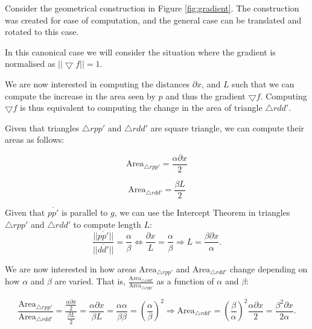 Consider the geometrical construction in Figure \ref{fig:gradient}. The construction was created for ease of computation, and the general case can be translated and rotated to this case.

In this canonical case we will consider the situation where the gradient is normalised as $||\bigtriangledown f|| = 1$. 

We are now interested in computing the distances $\partial x$, and $L$ such that we can compute the increase in the area seen by $p$ and thus the gradient $\bigtriangledown f$. Computing $\bigtriangledown f$ is thus equivalent to computing the change in the area of triangle $\triangle rdd'$.

Given that triangles $\triangle rpp'$ and $\triangle rdd'$ are square triangle, we can compute their areas as follows:

$$\text{Area}_{\triangle rpp'} = \frac{\alpha \partial x}{2}$$

$$\text{Area}_{\triangle rdd'} = \frac{\beta L}{2}$$

Given that $\overline{pp'}$ is parallel to $g$, we can use the Intercept Theorem in triangles $\triangle rpp'$ and $\triangle rdd'$ to compute length $L$: $$\frac{||\overline{pp'}||}{||\overline{dd'}||} = \frac \alpha \beta \iff \frac{\partial x}{L} = \frac \alpha \beta \Rightarrow L = \frac{\beta \partial x}{\alpha}.$$


We are now interested in how areas $\text{Area}_{\triangle rpp'}$ and $\text{Area}_{\triangle rdd'}$ change depending on how $\alpha$ and $\beta$ are varied. That is, $\frac{\text{Area}_{\triangle rdd'}}{\text{Area}_{\triangle rpp'}}$ as a function of $\alpha$ and $\beta$: 

$$\frac{\text{Area}_{\triangle rpp'}}{\text{Area}_{\triangle rdd'}} = \frac{\frac{\alpha \partial x}{2}}{\frac{\beta L}{2}} = \frac{\alpha \partial x}{\beta L} = \frac{\alpha \alpha}{\beta \beta} = {(\frac \alpha \beta)}^2 \Rightarrow \text{Area}_{\triangle rdd'} = {(\frac \beta \alpha)}^2 \frac{\alpha \partial x}{2} = \frac{\beta^2 \partial x}{2\alpha}.$$

